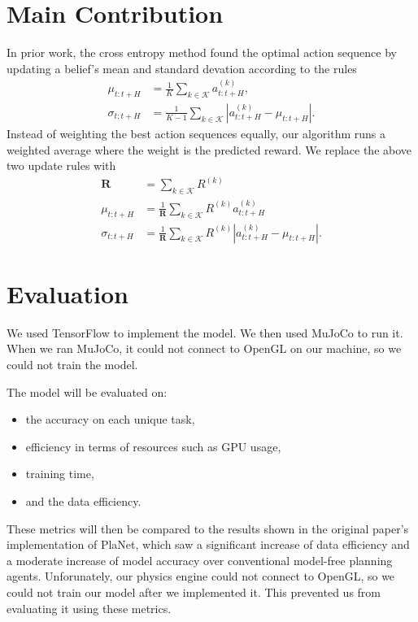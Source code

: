 \documentclass{IEEEtran}
\begin{document}
\section{Main Contribution}\label{main-contribution}
In prior work, the cross entropy method found the optimal action sequence by updating a belief's mean and standard devation according to the rules
\begin{align*}
    \mu_{t:t+H}    &= \frac{1}{K} \sum_{k \in \mathcal{K}} a^{(k)}_{t:t+H}, \\
    \sigma_{t:t+H} &= \frac{1}{K-1} \sum_{k \in \mathcal{K}} \left|a^{(k)}_{t:t+H} - \mu_{t:t+H}\right|.
\end{align*}
Instead of weighting the best action sequences equally, our algorithm runs a weighted average where the weight is the predicted reward.
We replace the above two update rules with
\begin{align*}
    \mathbf{R}     &= \sum_{k \in \mathcal{K}} R^{(k)} \\
    \mu_{t:t+H}    &= \frac{1}{\mathbf{R}} \sum_{k \in \mathcal{K}} R^{(k)} a^{(k)}_{t:t+H} \\
    \sigma_{t:t+H} &= \frac{1}{\mathbf{R}} \sum_{k \in \mathcal{K}} R^{(k)} \left|a^{(k)}_{t:t+H} - \mu_{t:t+H}\right|.
\end{align*}


\section{Evaluation}\label{evaluation}
We used TensorFlow \cite{tensorflow2015-whitepaper} to implement the model.
We then used MuJoCo \cite{conf/iros/TodorovET12} to run it.
When we ran MuJoCo, it could not connect to OpenGL on our machine, so we could not train the model.

The model will be evaluated on:
\begin{itemize}
\item the accuracy on each unique task,
\item efficiency in terms of resources such as GPU usage,
\item training time,
\item and the data efficiency.
\end{itemize}
These metrics will then be compared to the results shown in the original paper's implementation of PlaNet, which saw a significant increase of data efficiency and a moderate increase of model accuracy over conventional model-free planning agents.
Unforunately, our physics engine \cite{conf/iros/TodorovET12} could not connect to OpenGL, so we could not train our model after we implemented it.
This prevented us from evaluating it using these metrics.
\end{document}
